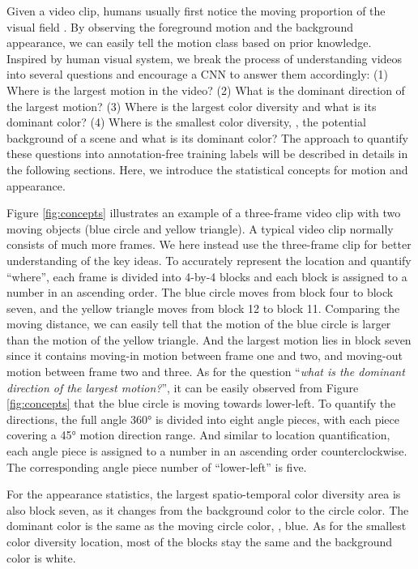 \documentclass[10pt,twocolumn,letterpaper]{article}
\begin{document}
Given a video clip, humans usually first notice the moving proportion of the visual field \cite{giese2003cognitive}. By observing the foreground motion and the background appearance, we can easily tell the motion class based on prior knowledge. 
Inspired by human visual system, we break the process of understanding videos into several questions and encourage a CNN to answer them accordingly: (1) Where is the largest motion in the video? (2) What is the dominant direction of the largest motion? (3) Where is the largest color diversity and what is its dominant color? (4) Where is the smallest color diversity, \ie, the potential background of a scene and what is its dominant color? 
The approach to quantify these questions into annotation-free training labels will be described in details in the following sections.
Here, we introduce the statistical concepts for motion and appearance. 
 
Figure \ref{fig:concepts} illustrates an example of a three-frame video clip with two moving objects (blue circle and yellow triangle). 
A typical video clip normally consists of much more frames. We here instead use the three-frame clip for better understanding of the key ideas. 
To accurately represent the location and quantify ``where'', each frame is divided into 4-by-4 blocks and each block is assigned to a number in an ascending order. The blue circle moves from block four to block seven, and the yellow triangle moves from block 12 to block 11. 
Comparing the moving distance, we can easily tell that the motion of the blue circle is larger than the motion of the yellow triangle. 
And the largest motion lies in block seven since it contains moving-in motion between frame one and two, and moving-out motion between frame two and three. 
As for the question ``\emph{what is the dominant direction of the largest motion?}'', it can be easily observed from Figure \ref{fig:concepts} that the blue circle is moving towards lower-left. 
To quantify the directions, the full angle \ang{360} is divided into eight angle pieces, with each piece covering a \ang{45} motion direction range. 
And similar to location quantification, each angle piece is assigned to a number in an ascending order counterclockwise. 
The corresponding angle piece number of ``lower-left'' is five.

For the appearance statistics, the largest spatio-temporal color diversity area is also block seven, as it changes from the background color to the circle color. 
The dominant color is the same as the moving circle color, \ie, blue. 
As for the smallest color diversity location, most of the blocks stay the same and the background color is white.
\end{document}
